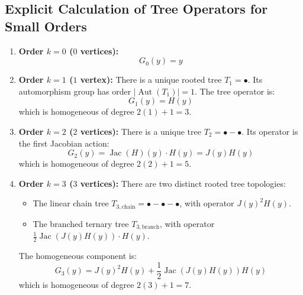 \documentclass[11pt,a4paper]{article}
\theoremstyle{definition}
\begin{document}
\subsection{Explicit Calculation of Tree Operators for Small Orders}

\begin{enumerate}
    \item \textbf{Order $k = 0$ ($0$ vertices):}
    \[ G_0(y) = y \]
    
    \item \textbf{Order $k = 1$ ($1$ vertex):}
    There is a unique rooted tree $T_1 = \bullet$. Its automorphism group has order $|\operatorname{Aut}(T_1)| = 1$. The tree operator is:
    \begin{equation}\label{eq:g1_tree}
    G_1(y) = H(y)
    \end{equation}
    which is homogeneous of degree $2(1) + 1 = 3$.
    
    \item \textbf{Order $k = 2$ ($2$ vertices):}
    There is a unique tree $T_2 = \bullet - \bullet$. Its operator is the first Jacobian action:
    \begin{equation}\label{eq:g2_tree}
    G_2(y) = \operatorname{Jac}(H)(y) \cdot H(y) = J(y) H(y)
    \end{equation}
    which is homogeneous of degree $2(2) + 1 = 5$.
    
    \item \textbf{Order $k = 3$ ($3$ vertices):}
    There are two distinct rooted tree topologies:
    \begin{itemize}
        \item The linear chain tree $T_{3, \text{chain}} = \bullet - \bullet - \bullet$, with operator $J(y)^2 H(y)$.
        \item The branched ternary tree $T_{3, \text{branch}}$, with operator $\frac{1}{2} \operatorname{Jac}(J(y) H(y)) \cdot H(y)$.
    \end{itemize}
    The homogeneous component is:
    \begin{equation}\label{eq:g3_tree}
    G_3(y) = J(y)^2 H(y) + \frac{1}{2} \operatorname{Jac}(J(y) H(y)) H(y)
    \end{equation}
    which is homogeneous of degree $2(3) + 1 = 7$.
\end{enumerate}
\end{document}
